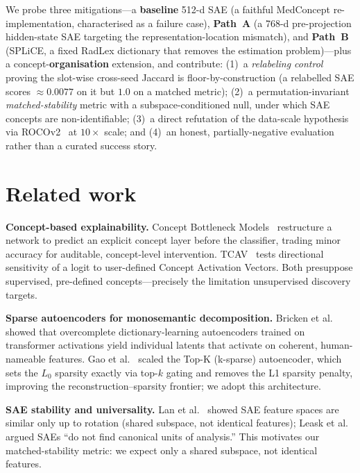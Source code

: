 \documentclass[sigconf, nonacm]{acmart}
\begin{document}
We probe three mitigations---a \textbf{baseline} 512-d SAE (a faithful MedConcept re-implementation, characterised as a failure case), \textbf{Path~A} (a 768-d pre-projection hidden-state SAE targeting the representation-location mismatch), and \textbf{Path~B} (SPLiCE, a fixed RadLex dictionary that removes the estimation problem)---plus a concept-\textbf{organisation} extension, and contribute: (1)~a \emph{relabeling control} proving the slot-wise cross-seed Jaccard is floor-by-construction (a relabelled SAE scores ${\approx}0.0077$ on it but $1.0$ on a matched metric); (2)~a permutation-invariant \emph{matched-stability} metric with a subspace-conditioned null, under which SAE concepts are non-identifiable; (3)~a direct refutation of the data-scale hypothesis via ROCOv2~\cite{rueckert2024rocov2} at $10{\times}$ scale; and (4)~an honest, partially-negative evaluation rather than a curated success story.

\section{Related work}
\textbf{Concept-based explainability.} Concept Bottleneck Models~\cite{koh2020concept} restructure a network to predict an explicit concept layer before the classifier, trading minor accuracy for auditable, concept-level intervention. TCAV~\cite{kim2018tcav} tests directional sensitivity of a logit to user-defined Concept Activation Vectors. Both presuppose supervised, pre-defined concepts---precisely the limitation unsupervised discovery targets.

\textbf{Sparse autoencoders for monosemantic decomposition.} Bricken et al.~\cite{bricken2023monosemanticity} showed that overcomplete dictionary-learning autoencoders trained on transformer activations yield individual latents that activate on coherent, human-nameable features. Gao et al.~\cite{gao2024scaling} scaled the Top-K (k-sparse) autoencoder, which sets the $L_0$ sparsity exactly via top-$k$ gating and removes the L1 sparsity penalty, improving the reconstruction--sparsity frontier; we adopt this architecture.

\textbf{SAE stability and universality.} Lan et al.~\cite{lan2024universality} showed SAE feature spaces are similar only up to rotation (shared subspace, not identical features); Leask et al.~\cite{leask2025canonical} argued SAEs ``do not find canonical units of analysis.'' This motivates our matched-stability metric: we expect only a shared subspace, not identical features.
\end{document}
